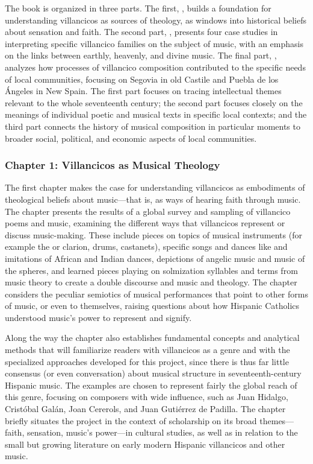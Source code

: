 \documentclass[tt]{vcbook-proposal}
\begin{document}
The book is organized in three parts.
The first, , builds a foundation for understanding villancicos as sources of theology, as windows into historical beliefs about sensation and faith.
The second part, , presents four case studies in interpreting specific villancico families on the subject of music, with an emphasis on the links between earthly, heavenly, and divine music.
The final part, , analyzes how processes of villancico composition contributed to the specific needs of local communities, focusing on Segovia in old Castile and Puebla de los Ángeles in New Spain.
The first part focuses on tracing intellectual themes relevant to the whole seventeenth century; the second part focuses closely on the meanings of individual poetic and musical texts in specific local contexts; and the third part connects the history of musical composition in particular moments to broader social, political, and economic aspects of local communities.

\subsubsection{Chapter 1: Villancicos as Musical Theology}

The first chapter makes the case for understanding villancicos as embodiments of theological beliefs about music---that is, as ways of hearing faith through music.
The chapter presents the results of a global survey and sampling of villancico poems and music, examining the different ways that villancicos represent or discuss music-making.
These include pieces on topics of musical instruments (for example the  or clarion, drums, castanets), specific songs and dances like  and imitations of African and Indian dances, depictions of angelic music and music of the spheres, and learned pieces playing on solmization syllables and terms from music theory to create a double discourse and music and theology.
The chapter considers the peculiar semiotics of musical performances that point to other forms of music, or even to themselves, raising questions about how Hispanic Catholics understood music's power to represent and signify.

Along the way the chapter also establishes fundamental concepts and analytical methods that will familiarize readers with villancicos as a genre and with the specialized approaches developed for this project, since there is thus far little consensus (or even conversation) about musical structure in seventeenth-century Hispanic music.
The examples are chosen to represent fairly the global reach of this genre, focusing on composers with wide influence, such as Juan Hidalgo, Cristóbal Galán, Joan Cererols, and Juan Gutiérrez de Padilla.
The chapter briefly situates the project in the context of scholarship on its broad themes---faith, sensation, music's power---in cultural studies, as well as in relation to the small but growing literature on early modern Hispanic villancicos and other music.
\end{document}
